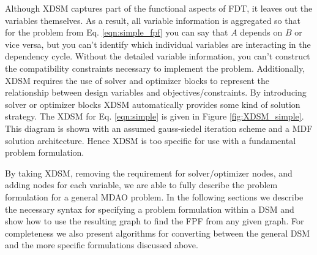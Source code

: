         Although XDSM captures part of the functional aspects of FDT, it leaves out the variables themselves. 
        As a result, all variable information is aggregated 
        so that for the problem from Eq. \ref{eqn:simple_fpf} you can say that $A$ depends on $B$ or vice versa, but you can't identify which 
        individual variables are interacting in the dependency cycle. Without the detailed variable information, you can't construct the compatibility 
        constraints necessary to implement the problem. Additionally, XDSM requires the use of solver and optimizer blocks to represent 
        the relationship between design variables and objectives/constraints. By introducing solver or optimizer blocks XDSM automatically provides
        some kind of solution strategy. The XDSM for Eq. \ref{eqn:simple} is given in Figure \ref{fig:XDSM_simple}. 
        This diagram is shown with an assumed gauss-siedel iteration scheme and a MDF solution architecture. 
        Hence XDSM is too specific for use with a fundamental problem formulation. 

        By taking XDSM, removing the requirement for solver/optimizer nodes, and adding nodes for each variable, we are able to fully describe 
        the problem formulation for a general MDAO problem. In the following sections we describe the necessary syntax for specifying a 
        problem formulation within a DSM and show how to use the resulting graph to find the FPF from any given graph. For completeness we 
        also present algorithms for converting between the general DSM and the more specific formulations discussed above. 


